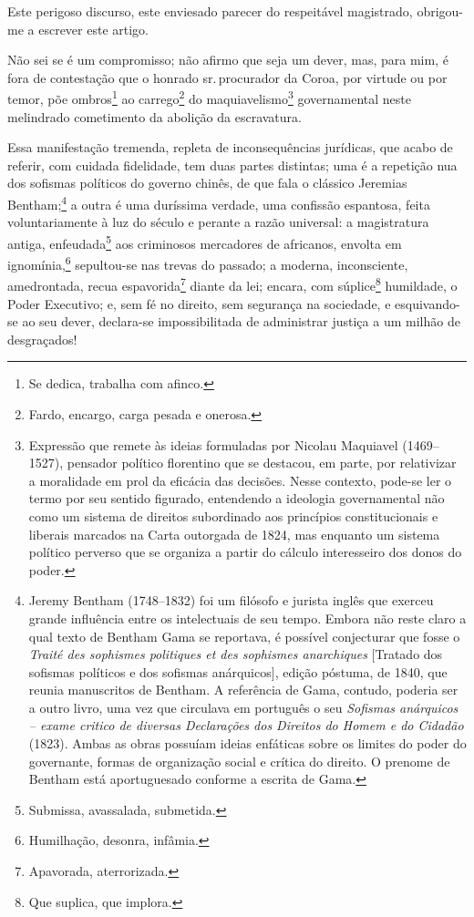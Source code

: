 Este perigoso discurso, este enviesado parecer do respeitável
magistrado, obrigou-me a escrever este artigo.

\asterisc

Não sei se é um compromisso; não afirmo que seja um dever, mas, para
mim, é fora de contestação que o honrado sr.\,procurador da Coroa, por
virtude ou por temor, põe ombros\footnote{Se dedica, trabalha com
  afinco.} ao carrego\footnote{Fardo, encargo, carga pesada e onerosa.}
do maquiavelismo\footnote{Expressão que remete às ideias formuladas
  por Nicolau Maquiavel (1469--1527), pensador político florentino que se 
  destacou, em parte, por relativizar a moralidade em prol da
  eficácia das decisões. Nesse contexto, pode-se ler o termo por seu
  sentido figurado, entendendo a ideologia governamental não como um
  sistema de direitos subordinado aos princípios constitucionais e
  liberais marcados na Carta outorgada de 1824, mas enquanto um sistema
  político perverso que se organiza a partir do cálculo interesseiro dos
  donos do poder.} governamental neste melindrado cometimento da
abolição da escravatura.

Essa manifestação tremenda, repleta de inconsequências jurídicas, que
acabo de referir, com cuidada fidelidade, tem duas partes distintas; uma
é a repetição nua dos sofismas políticos do governo chinês, de que fala
o clássico Jeremias Bentham;\footnote{Jeremy Bentham (1748--1832) foi um
  filósofo e jurista inglês que exerceu grande influência entre os
  intelectuais de seu tempo. Embora não reste claro a
  qual texto de Bentham Gama se reportava, é possível conjecturar que
  fosse o \emph{Traité des sophismes politiques et des sophismes
  anarchiques} {[}Tratado dos sofismas políticos e dos sofismas
  anárquicos{]}, edição póstuma, de 1840, que reunia manuscritos de
  Bentham. A referência de Gama, contudo, poderia ser a outro livro,
  uma vez que circulava em português o seu \emph{Sofismas
  anárquicos -- exame critico de diversas Declarações dos Direitos do
  Homem e do Cidadão} (1823). Ambas as obras possuíam ideias enfáticas
  sobre os limites do poder do governante, formas de organização social
  e crítica do direito. O prenome de Bentham está 
  aportuguesado conforme a escrita de Gama.} a outra é uma duríssima verdade, uma confissão
espantosa, feita voluntariamente à luz do século e perante a razão
universal: a magistratura antiga, enfeudada\footnote{Submissa,
  avassalada, submetida.} aos criminosos mercadores de africanos,
envolta em ignomínia,\footnote{Humilhação, desonra, infâmia.}
sepultou-se nas trevas do passado; a moderna, inconsciente, amedrontada,
recua espavorida\footnote{Apavorada, aterrorizada.} diante da lei;
encara, com súplice\footnote{Que suplica, que implora.} humildade, o
Poder Executivo; e, sem fé no direito, sem segurança na sociedade, e
esquivando-se ao seu dever, declara-se impossibilitada de administrar
justiça a um milhão de desgraçados!

